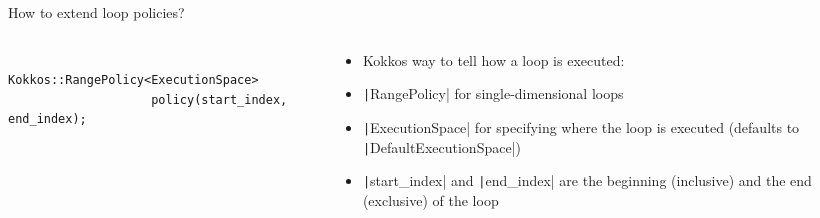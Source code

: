\documentclass[
    aspectratio=169,
    \createHandout
]{beamer}
\begin{document}
\begin{frame}[fragile]{How to extend loop policies?}
    \begin{columns}
        \begin{column}{0.55\linewidth}
            \begin{verbatim}
                Kokkos::RangePolicy<ExecutionSpace>
                    policy(start_index, end_index);
            \end{verbatim}
        \end{column}
        \begin{column}{0.45\linewidth}
            \begin{itemize}
                \item Kokkos way to tell how a loop is executed: 
                \item \texttt|RangePolicy| for single-dimensional loops
                \item \texttt|ExecutionSpace| for specifying where the loop is executed (defaults to \texttt|DefaultExecutionSpace|)
                \item \texttt|start_index| and \texttt|end_index| are the beginning (inclusive) and the end (exclusive) of the loop
            \end{itemize}
        \end{column}
    \end{columns}
\end{frame}

\end{document}
